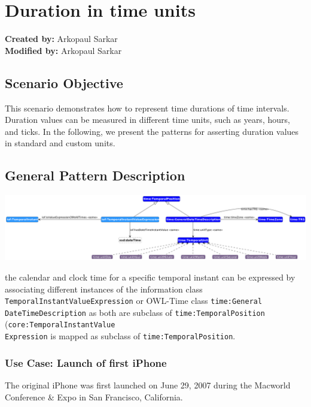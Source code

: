 \section{Duration in time units}
\label{sec-change-location}

\textbf{Created by:} Arkopaul Sarkar \\
\textbf{Modified by:} Arkopaul Sarkar \\

\subsection*{Scenario Objective}

This scenario demonstrates how to represent time durations of time intervals. Duration values can be measured in different time units, such as years, hours, and ticks. In the following, we present the patterns for asserting duration values in standard and custom units.   

\subsection*{General Pattern Description}

\includegraphics[scale=0.28]{scenarios/clock-time-calendar-date/images/general-clock-calendar.png}

the calendar and clock time for a specific temporal instant can be expressed by associating different instances of the information class \texttt{TemporalInstantValueExpression} or OWL-Time class \texttt{time:General\\DateTimeDescription} as both are subclass of \texttt{time:TemporalPosition} (\texttt{core:TemporalInstantValue\\Expression} is mapped as subclass of \texttt{time:TemporalPosition}.  

\subsubsection*{Use Case: Launch of first iPhone} 
The original iPhone was first launched on June 29, 2007 during the Macworld Conference \& Expo in San Francisco, California. 

